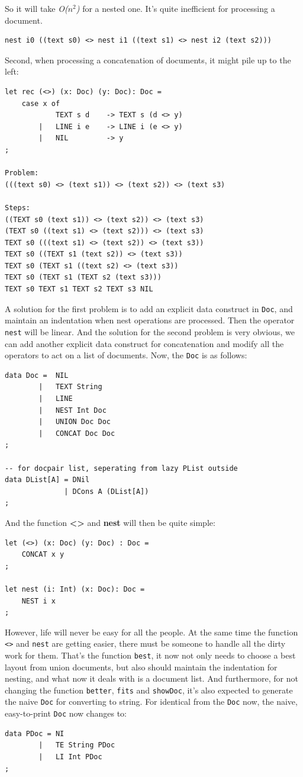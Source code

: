 So it will take \textit{O($n^2$)} for a nested one. It's quite inefficient for processing a document.
\begin{lstlisting}
nest i0 ((text s0) <> nest i1 ((text s1) <> nest i2 (text s2)))
\end{lstlisting}

Second, when processing a concatenation of documents, it might pile up to the left:
\begin{lstlisting}
let rec (<>) (x: Doc) (y: Doc): Doc =
    case x of
            TEXT s d    -> TEXT s (d <> y)
        |   LINE i e    -> LINE i (e <> y)
        |   NIL         -> y
;

Problem:
(((text s0) <> (text s1)) <> (text s2)) <> (text s3)

Steps:
((TEXT s0 (text s1)) <> (text s2)) <> (text s3)
(TEXT s0 ((text s1) <> (text s2))) <> (text s3)
TEXT s0 (((text s1) <> (text s2)) <> (text s3))
TEXT s0 ((TEXT s1 (text s2)) <> (text s3))
TEXT s0 (TEXT s1 ((text s2) <> (text s3))
TEXT s0 (TEXT s1 (TEXT s2 (text s3)))
TEXT s0 TEXT s1 TEXT s2 TEXT s3 NIL
\end{lstlisting}

A solution for the first problem is to add an explicit data construct in \texttt{Doc}, and maintain an indentation when nest operations are processed. Then the operator \texttt{nest} will be linear. And the solution for the second problem is very obvious, we can add another explicit data construct for concatenation and modify all
the operators to act on a list of documents. Now, the \texttt{Doc} is as follows:
\begin{lstlisting}
data Doc =  NIL
        |   TEXT String
        |   LINE
        |   NEST Int Doc
        |   UNION Doc Doc
        |   CONCAT Doc Doc
;

-- for docpair list, seperating from lazy PList outside
data DList[A] = DNil
              | DCons A (DList[A])
;
\end{lstlisting}

And the function \textbf{<>} and \textbf{nest} will then be quite simple:
\begin{lstlisting}
let (<>) (x: Doc) (y: Doc) : Doc =
    CONCAT x y
;

let nest (i: Int) (x: Doc): Doc =
    NEST i x
;
\end{lstlisting}

However, life will never be easy for all the people. At the same time the function \texttt{<>} and \texttt{nest} are getting easier, there must be someone to handle all the dirty work for them. That's the function \texttt{best}, it now not only needs to choose a best layout from union documents, but also should maintain the indentation for nesting, and what now it deals with is a document list. And furthermore, for not changing the function \texttt{better}, \texttt{fits} and \texttt{showDoc}, it's also expected to generate the naive \texttt{Doc} for converting to string. For identical from the \texttt{Doc} now, the naive, easy-to-print \texttt{Doc} now changes to:
\begin{lstlisting}
data PDoc = NI
        |   TE String PDoc
        |   LI Int PDoc
;
\end{lstlisting}


